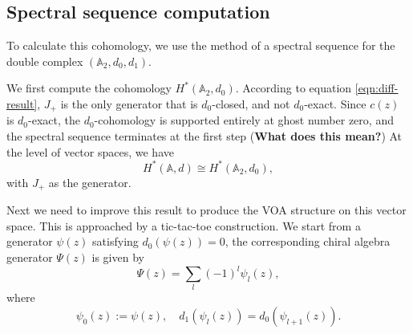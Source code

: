 \documentclass[a4paper,11pt]{article}
\begin{document}
\subsection{Spectral sequence computation}
To calculate this cohomology, we use the method of a spectral sequence for the double complex $(\mathbb{A}_2, d_0, d_1)$. 

We first compute the cohomology $H^*(\mathbb{A}_2,d_0)$. According to equation \eqref{eqn:diff-result}, $J_+$ is the only generator that is $d_0$-closed, and not $d_0$-exact. Since $c(z)$ is $d_0$-exact, the $d_0$-cohomology is supported entirely at ghost number zero, and the spectral sequence terminates at the first step (\textbf{What does this mean?}) At the level of vector spaces, we have
\begin{equation}
    H^*(\mathbb{A},d) \cong H^*(\mathbb{A}_2, d_0),
\end{equation}
with $J_+$ as the generator.

\bigskip
Next we need to improve this result to produce the VOA structure on this vector space. This is approached by a tic-tac-toe construction. We start from a generator $\psi(z)$ satisfying $d_0(\psi(z)) = 0$, the corresponding chiral algebra generator $\Psi(z)$ is given by
\begin{equation}
    \Psi(z) = \sum_{l}(-1)^l \psi_l(z),
\end{equation}
where
\begin{equation}
    \psi_0(z) := \psi(z), \quad d_1(\psi_l(z)) = d_0(\psi_{l+1}(z)).
\end{equation}

\bigskip
\end{document}
